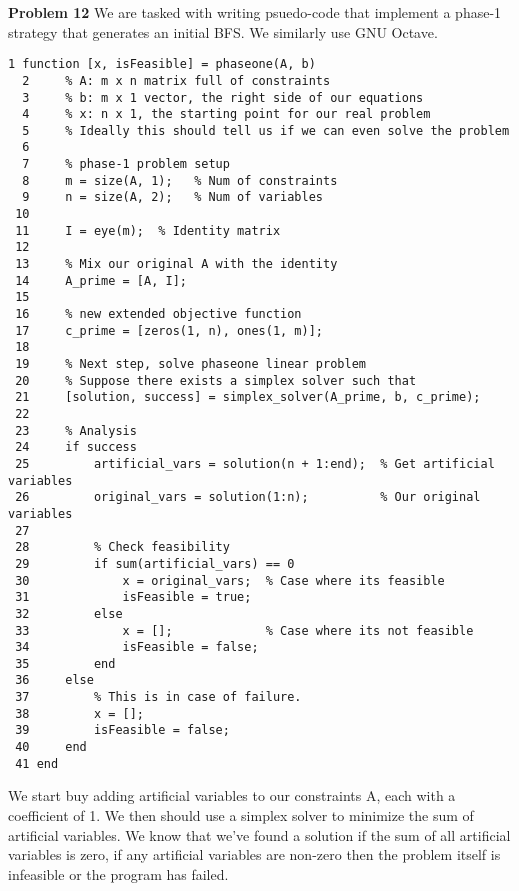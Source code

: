 \documentclass{article}
\begin{document}
\textbf{Problem 12} We are tasked with writing psuedo-code that implement a phase-1 strategy that generates an initial BFS. We similarly use GNU Octave. 
\begin{lstlisting}[style=cstyle]
  1 function [x, isFeasible] = phaseone(A, b)
  2     % A: m x n matrix full of constraints
  3     % b: m x 1 vector, the right side of our equations
  4     % x: n x 1, the starting point for our real problem                           
  5     % Ideally this should tell us if we can even solve the problem
  6       
  7     % phase-1 problem setup                   
  8     m = size(A, 1);   % Num of constraints    
  9     n = size(A, 2);   % Num of variables                     
 10  
 11     I = eye(m);  % Identity matrix                           
 12     
 13     % Mix our original A with the identity                            
 14     A_prime = [A, I];
 15     
 16     % new extended objective function                                            
 17     c_prime = [zeros(1, n), ones(1, m)];
 18     
 19     % Next step, solve phaseone linear problem
 20     % Suppose there exists a simplex solver such that
 21     [solution, success] = simplex_solver(A_prime, b, c_prime);
 22     
 23     % Analysis                  
 24     if success
 25         artificial_vars = solution(n + 1:end);  % Get artificial variables       
 26         original_vars = solution(1:n);          % Our original variables  
 27         
 28         % Check feasibility                                      
 29         if sum(artificial_vars) == 0
 30             x = original_vars;  % Case where its feasible      
 31             isFeasible = true;
 32         else
 33             x = [];             % Case where its not feasible
 34             isFeasible = false;
 35         end
 36     else   
 37         % This is in case of failure.                                   
 38         x = [];
 39         isFeasible = false;
 40     end
 41 end    
\end{lstlisting}
We start buy adding artificial variables to our constraints A, each with a coefficient of 1. We then should use a simplex solver to minimize the sum of artificial variables. We know that we've found a solution if the sum of all artificial variables is zero, if any artificial variables are non-zero then the problem itself is infeasible or the program has failed.
\end{document}

